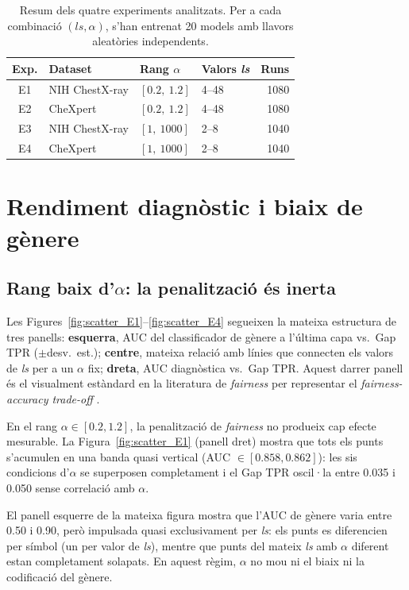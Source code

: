 \documentclass[a4paper,12pt,twoside]{ThesisStyle}
\begin{document}
\begin{table}[htb]
\centering
\begin{tabular}{clllr}
\hline
\textbf{Exp.} & \textbf{Dataset} & \textbf{Rang $\alpha$} & \textbf{Valors \textit{ls}} & \textbf{Runs} \\
\hline
E1 & NIH ChestX-ray & $[0.2,\ 1.2]$ & 4--48 & 1080 \\
E2 & CheXpert       & $[0.2,\ 1.2]$ & 4--48 & 1080 \\
E3 & NIH ChestX-ray & $[1,\ 1000]$      & 2--8  & 1040 \\
E4 & CheXpert       & $[1,\ 1000]$      & 2--8  & 1040 \\
\hline
\end{tabular}
\caption{Resum dels quatre experiments analitzats. Per a cada combinació $(ls, \alpha)$, s'han entrenat 20 models amb llavors aleatòries independents.}
\label{tab:experiments}
\end{table}

\section{Rendiment diagnòstic i biaix de gènere}

\subsection{Rang baix d'$\alpha$: la penalització és inerta}

Les Figures~\ref{fig:scatter_E1}--\ref{fig:scatter_E4} segueixen la mateixa estructura de tres panells: \textbf{esquerra}, AUC del classificador de gènere a l'última capa vs.\ Gap TPR ($\pm$desv.\ est.); \textbf{centre}, mateixa relació amb línies que connecten els valors de \textit{ls} per a un $\alpha$ fix; \textbf{dreta}, AUC diagnòstica vs.\ Gap TPR. Aquest darrer panell és el visualment estàndard en la literatura de \textit{fairness} per representar el \textit{fairness-accuracy trade-off} \cite{Barocas2023}.

En el rang $\alpha \in [0.2, 1.2]$, la penalització de \textit{fairness} no produeix cap efecte mesurable. La Figura~\ref{fig:scatter_E1} (panell dret) mostra que tots els punts s'acumulen en una banda quasi vertical (AUC $\in [0.858, 0.862]$): les sis condicions d'$\alpha$ se superposen completament i el Gap TPR oscil·la entre 0.035 i 0.050 sense correlació amb $\alpha$.

El panell esquerre de la mateixa figura mostra que l'AUC de gènere varia entre 0.50 i 0.90, però impulsada quasi exclusivament per \textit{ls}: els punts es diferencien per símbol (un per valor de \textit{ls}), mentre que punts del mateix \textit{ls} amb $\alpha$ diferent estan completament solapats. En aquest règim, $\alpha$ no mou ni el biaix ni la codificació del gènere.
\end{document}
